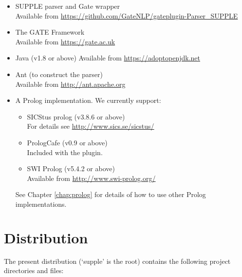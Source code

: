 \documentclass[a4paper,titlepage,openany,twoside]{book}
\begin{document}
\begin{itemize}

\item SUPPLE parser and Gate wrapper\\
Available from \url{https://github.com/GateNLP/gateplugin-Parser_SUPPLE}

\item The GATE Framework\\
Available from \url{https://gate.ac.uk}
 
\item Java (v1.8 or above)
Available from \url{https://adoptopenjdk.net}

\item Ant (to construct the parser)\\
Available from \url{http://ant.apache.org}

\item A Prolog implementation. We currently support:
\begin{itemize}
\item SICStus prolog (v3.8.6 or above)\\
For details see \url{http://www.sics.se/sicstus/}

\item PrologCafe (v0.9 or above)\\
Included with the plugin.

\item SWI Prolog (v5.4.2 or above)\\
Available from \url{http://www.swi-prolog.org/}
\end{itemize}
See Chapter \ref{chap:prolog} for details of how to use other Prolog implementations.

\end{itemize}

\chapter{Distribution}


The present distribution (`supple' is the root)  contains the
following project directories and files:
\end{document}
